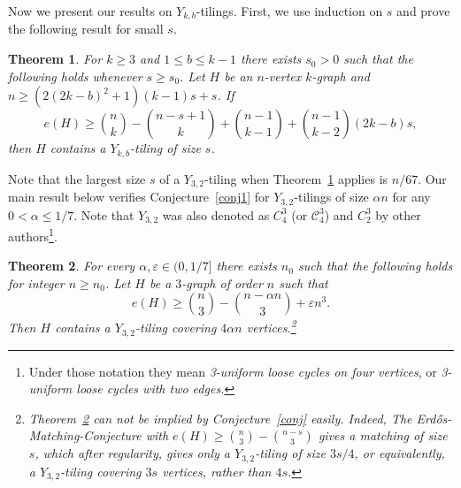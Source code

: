 \documentclass[11pt, reqno]{amsart}    	%
\newtheorem{thm}{Theorem}[section]
\theoremstyle{definition}
\numberwithin{equation}{section}
\begin{document}
	
	Now we present our results on $Y_{k,b}$-tilings.
	First, we use induction on $s$ and prove the following result for small $s$.
	
	\begin{thm} \label{ineg}
		For $k\ge 3$ and $1\le b \le k -1$ there exists $s_0>0$ such that the following holds whenever $s \ge s_0$.
		Let $H$ be an $n$-vertex $k$-graph and $n \ge (2(2k-b)^2+1)(k-1)s+s$.
		If 
		\[
		e(H) \ge \binom{n}{k} - \binom{n-s+1}{k} + \binom{n-1}{k-1}+ \binom{n-1}{k-2}(2k-b)s,
		\]
		then $H$ contains a $Y_{k,b}$-tiling of size $s$.
	\end{thm}
	Note that the largest size $s$ of a $Y_{3,2}$-tiling when Theorem~\ref{ineg} applies is 
	${n}/{67}$. 
	Our main result below verifies Conjecture~\ref{conj1} for $Y_{3,2}$-tilings of size $ \alpha {n}$ for any $0<\alpha \le  1/7$. Note that $Y_{3,2}$ was also denoted as $C_4^3$ (or $\mathcal C_4^3$) and $C_2^3$ by other authors\footnote{Under those notation they mean \emph{3-uniform loose cycles on four vertices}, or \emph{3-uniform loose cycles with two edges.}}.
	
	\begin{thm}\label{edge th2}
		For every $\alpha,\varepsilon \in (0, 1/7]$ there exists $n_0$ such that the following holds for integer $n\ge n_0$. 
		Let $H$ be a $3$-graph of order $n$ such that
		\[
		e(H)\ge\binom{n}{3}-\binom{n-\alpha n}{3}+\varepsilon n^3.
		\]
		Then $H$ contains a $Y_{3,2}$-tiling covering $ 4\alpha n$ vertices.\footnote{Theorem~\ref{edge th2} can  not be implied by Conjecture~\ref{conj} easily. Indeed, The Erd\H{o}s-Matching-Conjecture  with $ e(H)\ge \binom{n}{3} - \binom{n-s}{3} $ gives a matching of size $ s $, which after regularity, gives only a $Y_{3,2}$-tiling of size $ 3s/4 $, or equivalently, a $Y_{3,2}$-tiling covering $ 3s $ vertices, rather than $ 4s $.}
	\end{thm}	

\end{document}
